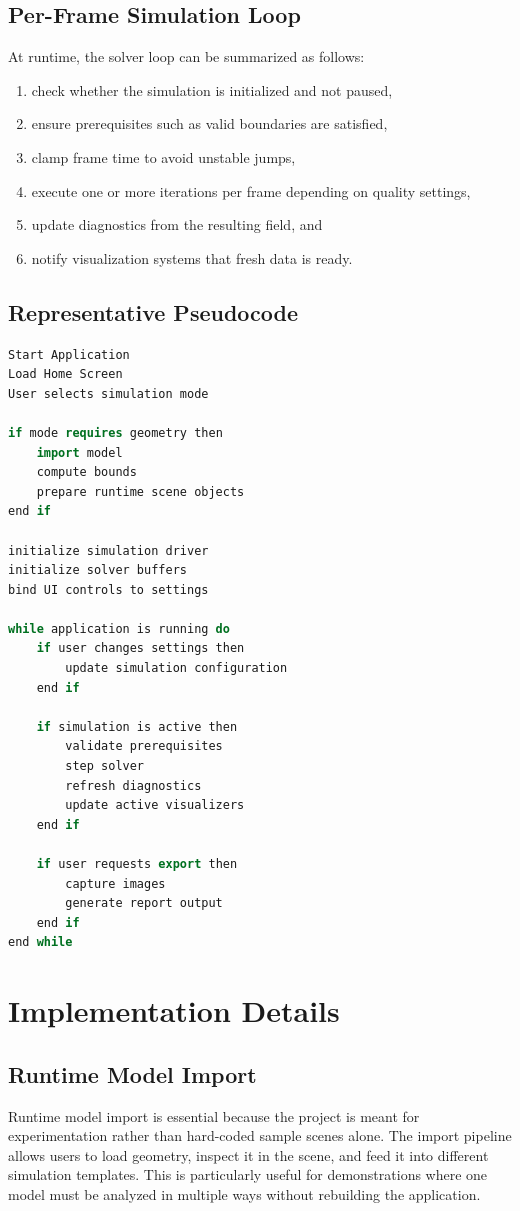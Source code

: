 \documentclass[12pt,a4paper,titlepage]{report}
\begin{document}
\section{Per-Frame Simulation Loop}
At runtime, the solver loop can be summarized as follows:
\begin{enumerate}
\item check whether the simulation is initialized and not paused,
\item ensure prerequisites such as valid boundaries are satisfied,
\item clamp frame time to avoid unstable jumps,
\item execute one or more iterations per frame depending on quality settings,
\item update diagnostics from the resulting field, and
\item notify visualization systems that fresh data is ready.
\end{enumerate}

\section{Representative Pseudocode}
\begin{lstlisting}[language=C++,caption={High-level workflow pseudocode for FluidWorks},label={lst:pseudocode}]
Start Application
Load Home Screen
User selects simulation mode

if mode requires geometry then
    import model
    compute bounds
    prepare runtime scene objects
end if

initialize simulation driver
initialize solver buffers
bind UI controls to settings

while application is running do
    if user changes settings then
        update simulation configuration
    end if

    if simulation is active then
        validate prerequisites
        step solver
        refresh diagnostics
        update active visualizers
    end if

    if user requests export then
        capture images
        generate report output
    end if
end while
\end{lstlisting}

\chapter{Implementation Details}
\section{Runtime Model Import}
Runtime model import is essential because the project is meant for experimentation rather than hard-coded sample scenes alone. The import pipeline allows users to load geometry, inspect it in the scene, and feed it into different simulation templates. This is particularly useful for demonstrations where one model must be analyzed in multiple ways without rebuilding the application.
\end{document}

